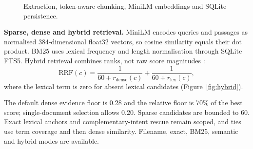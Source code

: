 \begin{figure}[htbp]
\centering
{}
\caption{Extraction, token-aware chunking, MiniLM embeddings and SQLite persistence.}
\label{fig:extract}
\end{figure}

\textbf{Sparse, dense and hybrid retrieval.} MiniLM encodes queries and passages as normalised 384-dimensional float32 vectors, so cosine similarity equals their dot product. BM25 uses lexical frequency and length normalisation through SQLite FTS5. Hybrid retrieval combines ranks, not raw score magnitudes \cite{RZ09,RG19,WWD20,STMiniLM,SQLiteFTS5}:
\begin{equation}
\mathrm{RRF}(c) = \frac{1}{60 + r_{\mathrm{dense}}(c)} + \frac{1}{60 + r_{\mathrm{lex}}(c)},
\end{equation}
where the lexical term is zero for absent lexical candidates (Figure~\ref{fig:hybrid}).

The default dense evidence floor is 0.28 and the relative floor is 70\% of the best score; single-document selection allows 0.20. Sparse candidates are bounded to 60. Exact lexical anchors and complementary-intent rescue remain scoped, and ties use term coverage and then dense similarity. Filename, exact, BM25, semantic and hybrid modes are available.

